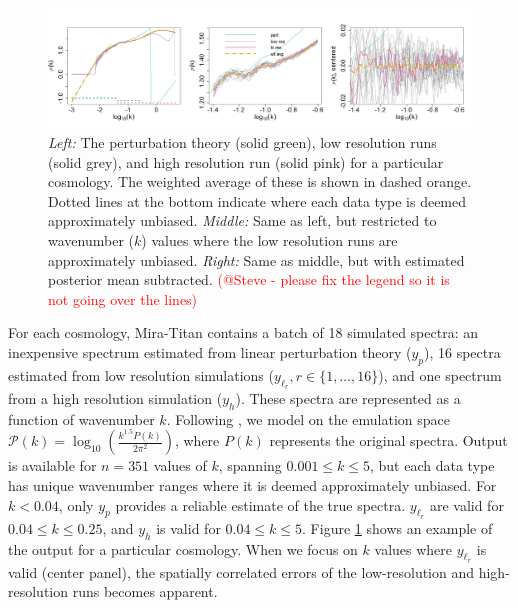 \documentclass[11pt]{article}
\begin{document}
\begin{figure}[ht]
    \centering 
    \includegraphics[width=\linewidth]{plot_data.png}
    \caption{{\it Left:} The perturbation theory (solid green), low resolution runs (solid grey), 
    and high resolution run  (solid pink) for a particular cosmology. 
    The weighted average of these is shown in dashed orange. Dotted lines at the bottom
    indicate where each data type is deemed approximately unbiased. 
    {\it Middle:} Same as left, but restricted to wavenumber ($k$) values where the low resolution 
    runs are approximately unbiased.
    {\it Right:} Same as middle, but with estimated posterior mean subtracted.
    \textcolor{red}{(@Steve - please fix the legend so it is not going over the lines)}}
    \label{fig:plot_data}
\end{figure}

For each cosmology, Mira-Titan contains a batch of 18 simulated spectra: an inexpensive 
spectrum estimated from linear perturbation theory ($y_p$), 16 spectra estimated from 
low resolution simulations ($y_{\ell_r}, r \in \{1,\dots,16\}$), and one spectrum from 
a high resolution simulation ($y_h$). 
These spectra are represented as a function of wavenumber $k$.  Following 
\cite{moran2023mira}, we model on the emulation space 
$\mathcal{P}(k)=\log_{10}\left(\frac{k^{1.5}P(k)}{2\pi^2}\right)$, where $P(k)$ represents the
original spectra. Output is available for $n=351$ values of $k$, spanning
$0.001 \leq k \leq 5$, but each data type has unique wavenumber ranges
where it is deemed approximately unbiased. For $k<0.04$, only $y_p$ provides a reliable 
estimate of the true spectra. $y_{\ell_r}$ are valid for $0.04 \leq k \leq 0.25$, and 
$y_h$ is valid for $0.04 \leq k \leq 5$.  Figure \ref{fig:plot_data} shows an example 
of the output for a particular cosmology. When we focus on $k$ values where $y_{\ell_r}$ 
is valid (center panel), the spatially correlated errors of the low-resolution and high-resolution runs 
becomes apparent.
\end{document}
